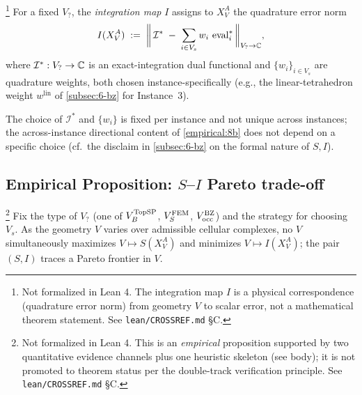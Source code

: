 \begin{definition}\label{def:integration-map}\footnote{Not formalized in Lean 4. The integration map $I$ is a physical correspondence (quadrature error norm) from geometry $V$ to scalar error, not a mathematical theorem statement. See \texttt{lean/CROSSREF.md} \S C.}
For a fixed $V_?$, the \emph{integration map} $I$ assigns to $X^A_V$
the quadrature error norm
\[
  I(X^A_V)
  \;:=\;
  \biggl\|\, \mathcal{I}^* \;-\; \sum_{i \in V_s} w_i \, \operatorname{eval}_i^*\, \biggr\|_{V_? \to \mathbb{C}},
\]
where $\mathcal{I}^* : V_? \to \mathbb{C}$ is an exact-integration dual
functional and $\{w_i\}_{i \in V_s}$ are quadrature weights, both
chosen instance-specifically (e.g., the linear-tetrahedron weight
$w^{\mathrm{lin}}$ of \cref{subsec:6-bz} for Instance~3).
\end{definition}

The choice of $\mathcal{I}^*$ and $\{w_i\}$ is fixed per instance and
not unique across instances; the across-instance directional content
of \cref{empirical:8b} does not depend on a specific choice (cf.\
the disclaim in \cref{subsec:6-bz} on the formal nature of $S, I$).

\subsection{Empirical Proposition: $S$--$I$ Pareto trade-off}\label{subsec:6-empirical}

\begin{empirical}\label{empirical:8b}\footnote{Not formalized in Lean 4. This is an \emph{empirical} proposition supported by two quantitative evidence channels plus one heuristic skeleton (see body); it is not promoted to theorem status per the double-track verification principle. See \texttt{lean/CROSSREF.md} \S C.}
Fix the type of $V_?$ (one of $V_B^{\mathrm{TopSP}}$, $V_S^{\mathrm{FEM}}$,
$V_{\mathrm{occ}}^{\mathrm{BZ}}$) and the strategy for choosing $V_s$. As the geometry
$V$ varies over admissible cellular complexes, no $V$ simultaneously
maximizes $V \mapsto S(X^A_V)$ and minimizes $V \mapsto I(X^A_V)$;
the pair $(S, I)$ traces a Pareto frontier in $V$.
\end{empirical}

